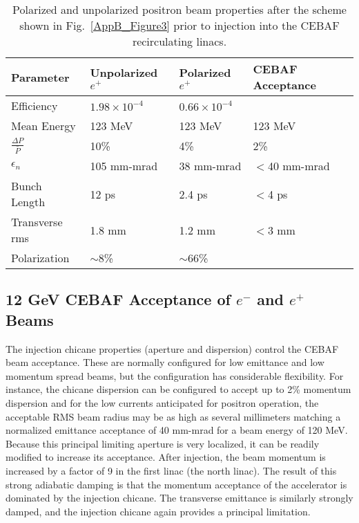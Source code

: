 \begin{table}
\centering
\begin{tabular}{l|l|l|l}
\hline
 Parameter       & Unpolarized $e^+$ &  Polarized $e^+$ &  CEBAF Acceptance\\   
\hline
Efficiency  & $1.98\times10^{-4}$ & $0.66\times10^{-4}$ &  \\
Mean Energy  & 123 MeV & 123 MeV  & 123 MeV \\
$\frac{\Delta P}{\bar{P}}$ & 10\% & 4\%  & 2\% \\
$\epsilon_n$  & 105 mm-mrad & 38 mm-mrad  & $<$40 mm-mrad \\
Bunch Length  & 12 ps & 2.4 ps & $<$4 ps \\
Transverse rms  & 1.8 mm & 1.2 mm & $<$3 mm \\
Polarization & $\sim8$\% & $\sim66$\% &\\
\hline
\end{tabular}
\caption{Polarized and unpolarized positron beam properties after the scheme shown in Fig.~\ref{AppB_Figure3} prior to injection into the CEBAF recirculating linacs.}
\label{AppB_Table1}
\end{table}

\subsection{12 GeV CEBAF Acceptance of $e^-$ and $e^+$ Beams}

The injection chicane properties (aperture and dispersion) control the CEBAF beam acceptance. These are normally configured for low emittance and low momentum spread beams, but the configuration has considerable flexibility. For instance, the chicane dispersion can be configured to accept up to 2\% momentum dispersion and for the low currents anticipated for positron operation, the acceptable RMS beam radius may be as high as several millimeters matching a normalized emittance acceptance of 40 mm-mrad for a beam energy of 120 MeV. Because this principal limiting aperture is very localized, it can be readily modified to increase its acceptance. After injection, the beam momentum is increased by a factor of 9 in the first linac (the north linac). The result of this strong adiabatic damping is that the momentum acceptance of the accelerator is dominated by the injection chicane. The transverse emittance is similarly strongly damped, and the injection chicane again provides a principal limitation.


